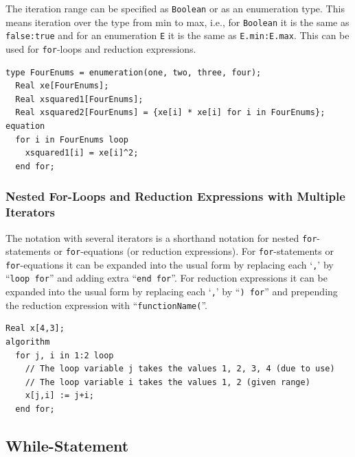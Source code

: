 The iteration range can be specified as \lstinline!Boolean! or as an enumeration type.
This means iteration over the type from min to max, i.e., for \lstinline!Boolean! it is the same as \lstinline!false:true! and for an enumeration \lstinline!E! it is the same as \lstinline!E.min:E.max!.
This can be used for \lstinline!for!-loops and reduction expressions.

\begin{example}
\begin{lstlisting}[language=modelica]
  type FourEnums = enumeration(one, two, three, four);
  Real xe[FourEnums];
  Real xsquared1[FourEnums];
  Real xsquared2[FourEnums] = {xe[i] * xe[i] for i in FourEnums};
equation
  for i in FourEnums loop
    xsquared1[i] = xe[i]^2;
  end for;
\end{lstlisting}
\end{example}


\subsubsection{Nested For-Loops and Reduction Expressions with Multiple Iterators}\label{nested-for-loops-and-reduction-expressions-with-multiple-iterators}

The notation with several iterators is a shorthand notation for nested \lstinline!for!-statements or \lstinline!for!-equations (or reduction expressions).
For \lstinline!for!-statements or \lstinline!for!-equations it can be expanded into the usual form by replacing each `\lstinline!,!' by ``\lstinline!loop for!'' and adding extra ``\lstinline!end for!''.
For reduction expressions it can be expanded into the usual form by replacing each `\lstinline!,!' by ``\lstinline!) for!'' and prepending the reduction expression with ``\lstinline!functionName(!''.

\begin{example}
\begin{lstlisting}[language=modelica]
  Real x[4,3];
algorithm
  for j, i in 1:2 loop
    // The loop variable j takes the values 1, 2, 3, 4 (due to use)
    // The loop variable i takes the values 1, 2 (given range)
    x[j,i] := j+i;
  end for;
\end{lstlisting}
\end{example}


\subsection{While-Statement}\label{while-statement}

